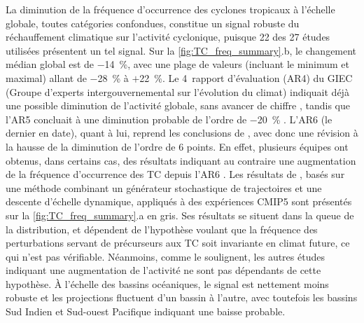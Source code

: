 \documentclass[../main.tex]{subfiles}
\begin{document}
La diminution de la fréquence d'occurrence des cyclones tropicaux à l'échelle globale, toutes catégories confondues, constitue un signal robuste du
réchauffement climatique sur l'activité cyclonique, puisque \num{22} des \num{27} études utilisées présentent un tel signal. Sur la
\cref{fig:TC_freq_summary}.b, le changement médian global est de \SI{-14}{\percent}, avec une plage de valeurs (incluant le minimum et maximal) allant de
\SI{-28}{\percent} à $+$\SI{22}{\percent}. Le \num{4}\ieme~rapport d'évaluation (AR4) du GIEC (Groupe d'experts intergouvernemental sur l’évolution du climat)
indiquait déjà une possible diminution de l'activité globale, sans avancer de chiffre \parencite{meehl_global_2007}, tandis que l'AR5 concluait à une diminution
probable de l'ordre de \SI{-20}{\percent} \parencite{christensen_climate_2013}. L'AR6 (le dernier en date), quant à lui, reprend les conclusions de
\cite{knutson_tropical_2020} \parencite{seneviratne_weather_2021}, avec donc une révision à la hausse de la diminution de l'ordre de \num{6} points. En effet,
plusieurs équipes ont obtenus, dans certains cas, des résultats indiquant au contraire une augmentation de la fréquence d'occurrence des TC depuis l'AR6
\parencite{camargo_global_2013,emanuel_downscaling_2013,wehner_resolution_2015,bhatia_projected_2018}. Les résultats de \cite{emanuel_downscaling_2013}, basés sur
une méthode combinant un générateur stochastique de trajectoires et une descente d'échelle dynamique, appliqués à des expériences CMIP5 sont présentés sur la
\cref{fig:TC_freq_summary}.a en gris. Ses résultats se situent dans la queue de la distribution, et dépendent de l'hypothèse voulant que la fréquence des
perturbations servant de précurseurs aux TC soit invariante en climat future, ce qui n'est pas vérifiable. Néanmoins, comme \cite{knutson_tropical_2020} le
soulignent, les autres études indiquant une augmentation de l'activité ne sont pas dépendants de cette hypothèse. À l'échelle des bassins océaniques, le signal
est nettement moins robuste et les projections fluctuent d'un bassin à l'autre, avec toutefois les bassins Sud Indien et Sud-ouest Pacifique indiquant une
baisse probable.
\end{document}
